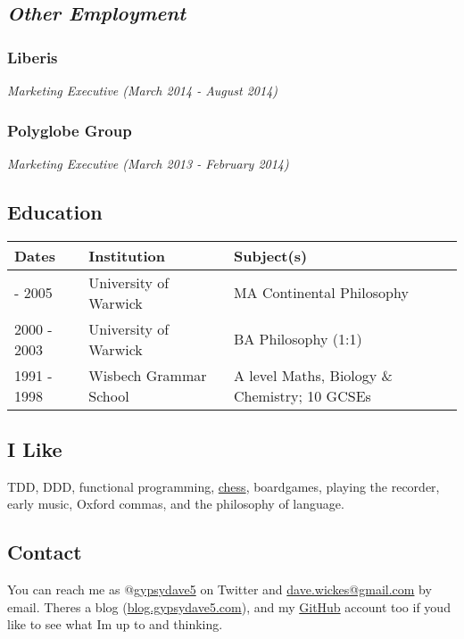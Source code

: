 \hypertarget{other-employment}{%
\subsection{\texorpdfstring{\emph{Other
Employment}}{Other Employment}}\label{other-employment}}

\hypertarget{liberis}{%
\subsubsection{Liberis}\label{liberis}}

\emph{Marketing Executive (March 2014 - August 2014)}

\hypertarget{polyglobe-group}{%
\subsubsection{Polyglobe Group}\label{polyglobe-group}}

\emph{Marketing Executive (March 2013 - February 2014)}

\hypertarget{education}{%
\subsection{Education}\label{education}}

\begin{longtable}[]{@{}lll@{}}
\toprule\noalign{}
Dates & Institution & Subject(s) \\
\midrule\noalign{}
\endhead
\bottomrule\noalign{}
\endlastfoot
2003 - 2005 & University of Warwick & MA Continental Philosophy \\
2000 - 2003 & University of Warwick & BA Philosophy (1:1) \\
1991 - 1998 & Wisbech Grammar School & A level Maths, Biology \&
Chemistry; 10 GCSEs \\
\end{longtable}

\hypertarget{i-like}{%
\subsection{I Like}\label{i-like}}

TDD, DDD, functional programming,
\href{https://www.chess.com/member/gypsydave5}{chess}, boardgames,
playing the recorder, early music, Oxford commas, and the philosophy of
language.

\hypertarget{contact}{%
\subsection{Contact}\label{contact}}

You can reach me as @\href{https://twitter.com/gypsydave5}{gypsydave5}
on Twitter and \href{mailto:dave@gypsydave5.com}{dave.wickes@gmail.com}
by email. There\textquotesingle s a blog
(\href{http://blog.gypsydave5.com/}{blog.gypsydave5.com}), and my
\href{https://github.com/gypsydave5}{GitHub} account too if
you\textquotesingle d like to see what I\textquotesingle m up to and
thinking.
